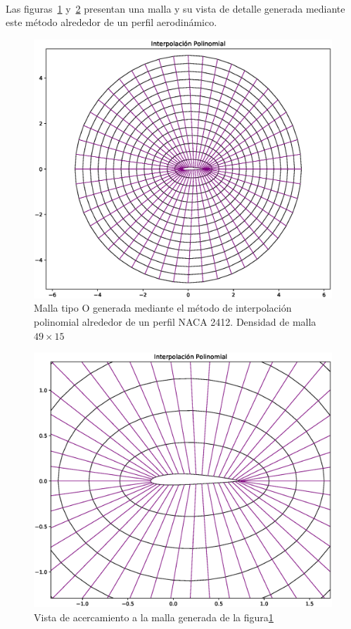\documentclass[letterpaper, openright, 12pt]{book}
\begin{document}
    \paragraph*{}
    Las figuras~\ref{fig:malla-inter} y~\ref{fig:malla-inter-cerca}
    presentan una malla y su vista de detalle generada mediante este método
    alrededor de un perfil aerodinámico.
    \begin{figure}[htbp!]
        \centering
        \includegraphics[keepaspectratio, width=120mm]{./img/M-inter_pol}
        \captionsetup{justification=centering, margin=2cm}
        \caption[Malla Interpolación Polinomial]{Malla tipo O generada
        mediante el método de interpolación polinomial alrededor de un
        perfil NACA 2412. Densidad de malla $49\times15$}
        \label{fig:malla-inter}
    \end{figure}
    \begin{figure}[htbp!]
        \centering
        \includegraphics[width=120mm]{./img/M-inter_pol_cerca}
        \captionsetup{justification=centering, margin=2cm}
        \caption[Malla Interpolación Polinomial Acercamiento]{Vista de
        acercamiento a la malla generada de la figura\ref{fig:malla-inter}}
        \label{fig:malla-inter-cerca}
    \end{figure}
\end{document}
